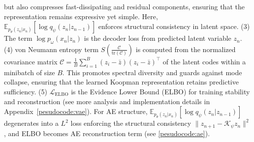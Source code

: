 \documentclass{article} %
\newcommand{\zs}[1]{\textcolor{blue}{[ZS: #1]}}
\begin{document}
but also compresses fast-dissipating and residual components, 
ensuring that the representation remains expressive yet simple. 
Here, $\mathbb{E}_{p_\theta(z_n | x_n)}[\log q_\psi(z_n | z_{n-1})]$ enforces structural consistency in latent space. (3) The term $\log p_{\omega}(x_n|z_n)$ is the decoder loss from predicted latent variable $z_n$. (4) von Neumann entropy term 
$S\!\left(\tfrac{\mathcal{C}}{\mathrm{tr}(\mathcal{C})}\right)$ 
is computed from the normalized covariance matrix 
$\mathcal{C} = \tfrac{1}{B}\sum_{i=1}^{B} (z_i - \bar{z})(z_i - \bar{z})^\top$ 
of the latent codes within a minibatch of size $B$. 
This promotes spectral diversity and guards against mode collapse, ensuring that the learned Koopman representation retains predictive sufficiency. (5) $\mathcal{L}_{\text{ELBO}}$ is the Evidence Lower Bound (ELBO) for training stability and reconstruction (see more analysis and implementation details in Appendix~\ref{pesudocode:vae}). For AE structure, $\mathbb{E}_{p_\theta(z_n | x_n)}[\log q_\psi(z_n | z_{n-1})]$ degenerates into a $L^2$ loss enforcing the structural consistency $\|z_{n+1}-\mathcal {K}_{\psi} z_n\|^2$, and ELBO becomes AE reconstruction term (see \ref{pesudocode:ae}).






   
\end{document}
